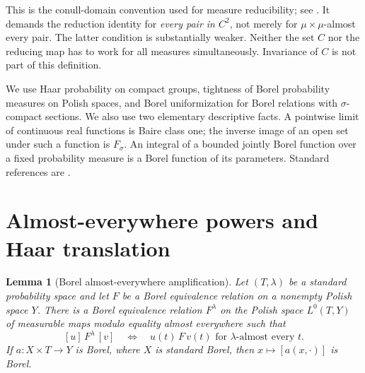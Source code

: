 \documentclass[11pt]{article}
\newtheorem{lemma}[theorem]{Lemma}
\theoremstyle{definition}
\theoremstyle{remark}
\newcommand{\Lzero}{L^0}
\begin{document}
This is the conull-domain convention used for measure reducibility;
see \cite[Introduction, Basic notions]{CM}. It demands the reduction
identity for \emph{every pair in $C^2$}, not merely for
$\mu\times\mu$-almost every pair. The latter condition is substantially
weaker. Neither the set $C$ nor the reducing map has to work for all
measures simultaneously. Invariance of $C$ is not part of this definition.

We use Haar probability on compact groups, tightness of Borel probability
measures on Polish spaces, and Borel uniformization for Borel relations
with $\sigma$-compact sections. We also use two elementary descriptive
facts. A pointwise limit of continuous real functions is Baire class one;
the inverse image of an open set under such a function is $F_\sigma$.
An integral of a bounded jointly Borel function over a fixed probability
measure is a Borel function of its parameters. Standard references are
\cite{Kechris,Gao}.

\section{Almost-everywhere powers and Haar translation}
\begin{lemma}[Borel almost-everywhere amplification]
Let $(T,\lambda)$ be a standard probability space and let $F$ be a Borel
equivalence relation on a nonempty Polish space $Y$. There is a Borel
equivalence relation $F^{\lambda}$ on the Polish space $\Lzero(T,Y)$ of
measurable maps modulo equality almost everywhere such that
\[
 [u]\,F^{\lambda}\,[v]
 \quad\Longleftrightarrow\quad
 u(t)\,F\,v(t)\text{ for $\lambda$-almost every }t.
\]
If $a:X\times T\to Y$ is Borel, where $X$ is standard Borel, then
$x\mapsto[a(x,\cdot)]$ is Borel.
\end{lemma}
\end{document}
